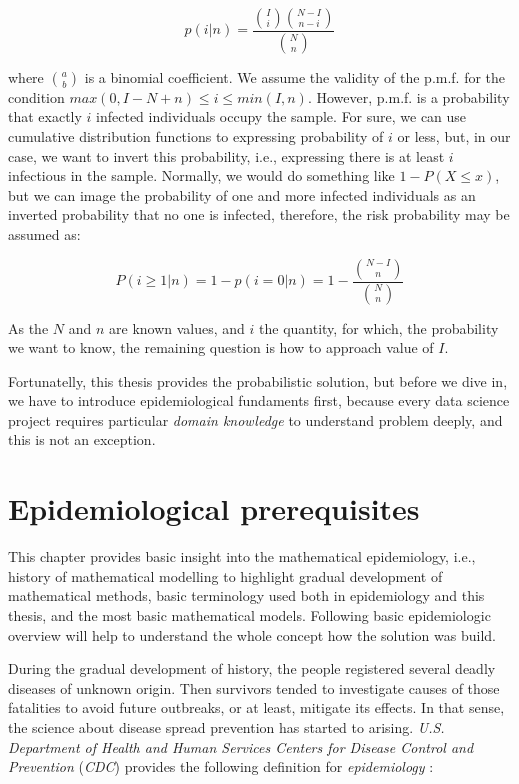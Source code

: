 \documentclass[
  digital, %
  oneside, %
  lof,     %
  lot,     %
]{fithesis4}
\begin{document}
\begin{equation}
  p(i|n) = \frac{ \binom{I}{i} \binom{N - I}{n - i} }{ \binom{N}{n} }
\end{equation}

where $\binom{a}{b}$ is a binomial coefficient.
We assume the validity of the p.m.f. for the condition
$max\left( 0, I - N + n \right) \leq i \leq min\left( I, n \right)$.
However, p.m.f. is a probability that exactly $i$
infected individuals occupy the sample.
For sure, we can use cumulative distribution functions
to expressing probability of $i$ or less, but, 
in our case, we want to invert this probability,
i.e., expressing there is at least $i$ infectious in the sample.
Normally, we would do something like $1 - P(X \leq x)$,
but we can image the probability of one and more
infected individuals as an inverted probability that
no one is infected, therefore, the risk 
probability may be assumed as:

\begin{equation}\label{eq:risk-theoretic}
  P(i \geq 1|n) = 1 - p(i=0|n) = 1 - \frac{
    \binom{N - I}{n}
  }{
    \binom{N}{n}
  }
\end{equation}

As the $N$ and $n$ are known values, and $i$ the quantity, for 
which, the probability we want to know, the 
remaining question is how to approach value of $I$.

Fortunatelly, this thesis provides the probabilistic solution,
but before we dive in, we have to introduce
epidemiological fundaments first, because every data science
project requires particular \textit{domain knowledge} to
understand problem deeply, and this is not an exception.


\chapter{Epidemiological prerequisites}
\label{chap:epidemiological-prerequisites}

This chapter provides basic insight into the mathematical
epidemiology, 
i.e., history of mathematical modelling to highlight gradual 
development of mathematical methods, basic terminology 
used both in epidemiology and this thesis, and the most 
basic mathematical models.
Following basic epidemiologic 
overview will help to understand the whole concept how 
the solution was build.

During the gradual development of history,
the people registered several deadly diseases of unknown origin.
Then survivors tended to investigate causes of those 
fatalities to avoid future outbreaks, or at least, mitigate its effects.
In that sense, the science about disease spread 
prevention has started to arising.
\textit{U.S. Department of Health and Human Services Centers 
for Disease Control and Prevention} (\textit{CDC}) provides the 
following definition for \textit{epidemiology} \cite{cdc2006}:
\end{document}
